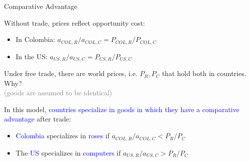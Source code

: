 \documentclass[notes,11pt, aspectratio=169, xcolor=table]{beamer}
\newcommand{\blue}[1]{\textcolor{blue}{#1}}
\newcommand{\blue}[1]{\textcolor{blue}{#1}}
\newenvironment{wideitemize}{\itemize\addtolength{\itemsep}{10pt}}{\enditemize}
\begin{document}
\begin{frame}{Comparative Advantage}

\begin{wideitemize}

    \item Without trade, prices reflect opportunity cost:
    \begin{itemize}
        \item In Colombia: $a_{COL,R}/a_{COL,C} = P_{COL,R}/P_{COL,C}$
        \item In the US: $a_{US,R}/a_{US,C} = P_{US,R}/P_{US,C}$
    \end{itemize}

    \item<2-> Under free trade, there are world prices, i.e. $P_R,P_C$ that hold both in countries. Why? \\
        \qquad \textcolor{gray}{(goods are assumed to be identical)}

    \item<3->  In this model, \blue{countries specialize in goods in which they have a comparative advantage} after trade:
    
    \begin{itemize}
        \item<3->  \blue{Colombia} specializes in \blue{roses} if $a_{COL,R}/a_{COL,C} < P_R/P_C$
        \item<3-> The \blue{US} specializes in \blue{computers} if $a_{US,R}/a_{US,C} > P_R/P_C$
    \end{itemize}

\end{wideitemize}

\end{frame}
\end{document}
